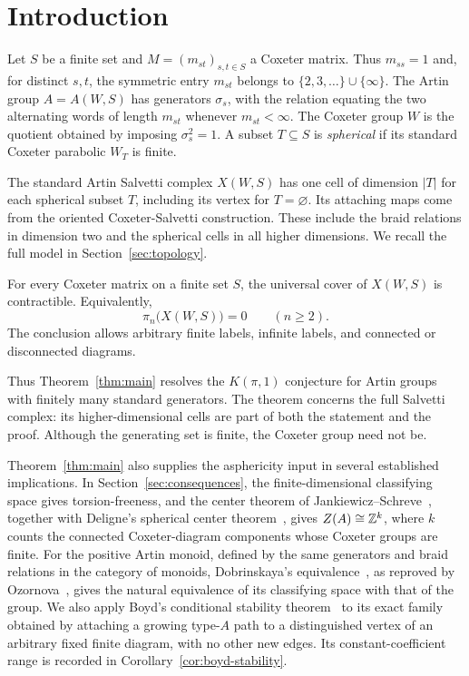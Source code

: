 \section{Introduction}\label{sec:introduction}

Let \(S\) be a finite set and \(M=(m_{st})_{s,t\in S}\) a Coxeter
matrix.  Thus \(m_{ss}=1\) and, for distinct \(s,t\), the symmetric
entry \(m_{st}\) belongs to
\(\{2,3,\ldots\}\cup\{\infty\}\).
The Artin group \(A=A(W,S)\) has generators \(\sigma_s\), with the
relation equating the two alternating words of length \(m_{st}\)
whenever \(m_{st}<\infty\).  The Coxeter group \(W\) is the quotient
obtained by imposing \(\sigma_s^2=1\).
A subset \(T\subseteq S\) is \emph{spherical} if its standard Coxeter
parabolic \(W_T\) is finite.

The standard Artin Salvetti complex \(X(W,S)\) has one cell of
dimension \(|T|\) for each spherical subset \(T\), including its
vertex for \(T=\varnothing\).  Its attaching maps come from the
oriented Coxeter-Salvetti construction.  These include the braid
relations in dimension two and the spherical cells in all higher
dimensions.  We recall the full model in
Section~\ref{sec:topology}.

\begin{theorem}\label{thm:main}
For every Coxeter matrix on a finite set \(S\), the universal cover
of \(X(W,S)\) is contractible.  Equivalently,
\[
  \pi_n\bigl(X(W,S)\bigr)=0\qquad(n\ge2).
\]
The conclusion allows arbitrary finite labels, infinite labels,
and connected or disconnected diagrams.
\end{theorem}

Thus Theorem~\ref{thm:main} resolves the \(K(\pi,1)\) conjecture
for Artin groups with finitely many standard generators.
The theorem concerns the full Salvetti complex: its
higher-dimensional cells are part of both the statement and the proof.
Although the generating set is finite, the Coxeter group need not be.

Theorem~\ref{thm:main} also supplies the asphericity input in several
established implications.  In Section~\ref{sec:consequences}, the
finite-dimensional classifying space gives torsion-freeness, and the
center theorem of Jankiewicz--Schreve~\cite[Theorem~3]{JankiewiczSchreve2022},
together with Deligne's spherical center theorem~\cite[Theorem~4.21]{Deligne1972},
gives \(Z(A)\cong\mathbb Z^k\), where \(k\) counts the connected
Coxeter-diagram components whose Coxeter groups are finite.  For the
positive Artin monoid, defined by the same generators and braid relations
in the category of monoids, Dobrinskaya's equivalence~\cite{Dobrinskaya2002},
as reproved by Ozornova~\cite[Section~5]{Ozornova2013}, gives the natural
equivalence of its classifying space with that of the group.  We also apply Boyd's
conditional stability theorem~\cite[Corollary~B]{Boyd2020} to its exact
family obtained by attaching a growing type-\(A\) path to a distinguished
vertex of an arbitrary fixed finite diagram, with no other new edges.
Its constant-coefficient range is recorded in
Corollary~\ref{cor:boyd-stability}.

